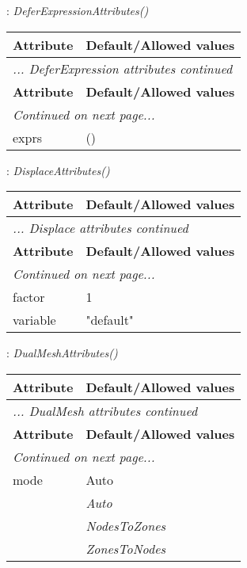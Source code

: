 \documentclass[10pt,a4paper]{report}
\begin{document}
\newpage

{}
: {\it DeferExpressionAttributes() }\\[-3mm]

\begin{longtable}{ll}
{\bf Attribute} & {\bf Default/Allowed values} \\
\hline \hline
\endfirsthead
\multicolumn{2}{l}{{\it ... DeferExpression attributes continued}} \\
{\bf Attribute} & {\bf Default/Allowed values} \\
\hline \hline
\endhead
\hline
\multicolumn{2}{l}{{\it Continued on next page...}} \\
\endfoot
\hline
\endlastfoot

exprs  &  () \\
\end{longtable}

\newpage

{}
: {\it DisplaceAttributes() }\\[-3mm]

\begin{longtable}{ll}
{\bf Attribute} & {\bf Default/Allowed values} \\
\hline \hline
\endfirsthead
\multicolumn{2}{l}{{\it ... Displace attributes continued}} \\
{\bf Attribute} & {\bf Default/Allowed values} \\
\hline \hline
\endhead
\hline
\multicolumn{2}{l}{{\it Continued on next page...}} \\
\endfoot
\hline
\endlastfoot

factor  &  1 \\
variable  &  "default" \\
\end{longtable}

\newpage

{}
: {\it DualMeshAttributes() }\\[-3mm]

\begin{longtable}{ll}
{\bf Attribute} & {\bf Default/Allowed values} \\
\hline \hline
\endfirsthead
\multicolumn{2}{l}{{\it ... DualMesh attributes continued}} \\
{\bf Attribute} & {\bf Default/Allowed values} \\
\hline \hline
\endhead
\hline
\multicolumn{2}{l}{{\it Continued on next page...}} \\
\endfoot
\hline
\endlastfoot

mode  &  Auto   \\
 & {\it  Auto} \\
 & {\it  NodesToZones} \\
 & {\it  ZonesToNodes} \\
\end{longtable}
\end{document}
